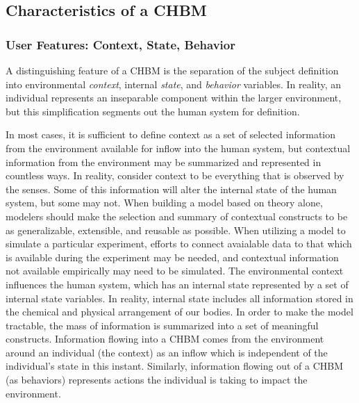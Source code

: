 \documentclass[runningheads,a4paper]{llncs}
\begin{document}
\subsection{Characteristics of a CHBM}
\subsubsection{User Features: Context, State, Behavior}
A distinguishing feature of a CHBM is the separation of the subject definition into environmental \emph{context}, internal \emph{state}, and \emph{behavior} variables.
In reality, an individual represents an inseparable component within the larger environment, but this simplification segments out the human system for definition.

In most cases, it is sufficient to define context as a set of selected information from the environment available for inflow into the human system, but contextual information from the environment may be summarized and represented in countless ways.
In reality, consider context to be everything that is observed by the senses. 
Some of this information will alter the internal state of the human system, but some may not. 
When building a model based on theory alone, modelers should make the selection and summary of contextual constructs to be as generalizable, extensible, and reusable as possible.
When utilizing a model to simulate a particular experiment, efforts to connect avaialable data to that which is available during the experiment may be needed, and contextual information not available empirically may need to be simulated.
The environmental context influences the human system, which has an internal state represented by a set of internal state variables.
In reality, internal state includes all information stored in the chemical and physical arrangement of our bodies. 
In order to make the model tractable, the mass of information is summarized into a set of meaningful constructs.
Information flowing into a CHBM comes from the environment around an individual (the context) as an inflow which is independent of the individual's state in this instant.
Similarly, information flowing out of a CHBM (as behaviors) represents actions the individual is taking to impact the environment.
\end{document}
